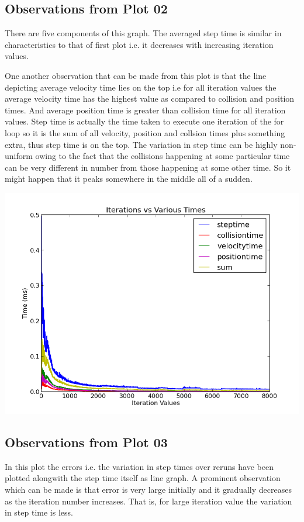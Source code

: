 \documentclass [11pt]{report}
\begin{document}
\subsection{Observations from Plot 02}

There are five components of this graph. The averaged step time is similar in characteristics to that of first plot i.e. it decreases with increasing iteration values.

One another observation that can be made from this plot is that the line depicting average velocity time lies on the top i.e for all iteration values the average velocity time has the highest value as compared to collision and position times. And average position time is greater than collision time for all iteration values. Step time is actually the time taken to execute one iteration of the for loop so it is the sum of all velocity, position and collsion times plus something extra, thus step time is on the top. The variation in step time can be highly non-uniform owing to the fact that the collisions happening at some particular time can be very different in number from those happening at some other time. So it might happen that it peaks somewhere in the middle all of a sudden.
\begin{center}
\includegraphics[scale=0.7]{./images/plot02.png}
\end{center}

\subsection{Observations from Plot 03}
In this plot the errors i.e. the variation in step times over reruns have been plotted alongwith the step time itself as line graph. A prominent observation which can be made is that error is very large initially and it gradually decreases as the iteration number increases. That is, for large iteration value the variation in step time is less.
 
\end{document}
